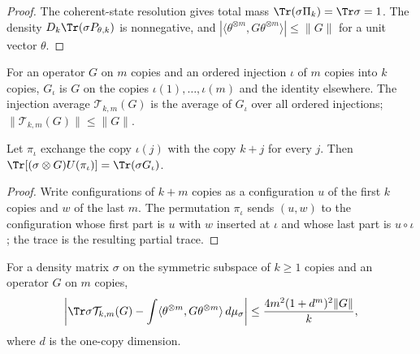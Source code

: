 \begin{proof}\leanok
    The coherent-state resolution gives total mass $\Tr(\sigma\Pi_k)=\Tr\sigma=1$. The
    density $D_k\Tr(\sigma P_{\theta,k})$ is nonnegative, and
    $|\langle\theta^{\otimes m},G\theta^{\otimes m}\rangle|\le\|G\|$ for a unit vector
    $\theta$.
\end{proof}

\begin{definition}
    \label{def:injection_average}
    \leanok
    For an operator $G$ on $m$ copies and an ordered injection $\iota$ of $m$ copies into
    $k$ copies, $G_\iota$ is $G$ on the copies $\iota(1),\dots,\iota(m)$ and the identity
    elsewhere. The injection average $\mathcal T_{k,m}(G)$ is the average of $G_\iota$ over
    all ordered injections; $\|\mathcal T_{k,m}(G)\|\le\|G\|$.
\end{definition}

\begin{lemma}
    \label{lem:matched_swaps}
    \leanok
    Let $\pi_\iota$ exchange the copy $\iota(j)$ with the copy $k+j$ for every $j$. Then
    $\Tr[(\sigma\otimes G)U(\pi_\iota)]=\Tr(\sigma G_\iota)$.
\end{lemma}

\begin{proof}\leanok
    Write configurations of $k+m$ copies as a configuration $u$ of the first $k$ copies and
    $w$ of the last $m$. The permutation $\pi_\iota$ sends $(u,w)$ to the configuration whose
    first part is $u$ with $w$ inserted at $\iota$ and whose last part is $u\circ\iota$; the
    trace is the resulting partial trace.
\end{proof}

\begin{theorem}
    \label{thm:uniform_husimi}
    \leanok
    For a density matrix $\sigma$ on the symmetric subspace of $k\ge1$ copies and an
    operator $G$ on $m$ copies,
    \[
        \left|\Tr\sigma\mathcal T_{k,m}(G)
            -\int\langle\theta^{\otimes m},G\theta^{\otimes m}\rangle\,d\mu_\sigma\right|
        \le\frac{4m^2(1+d^m)^2\|G\|}{k},
    \]
    where $d$ is the one-copy dimension.
\end{theorem}

